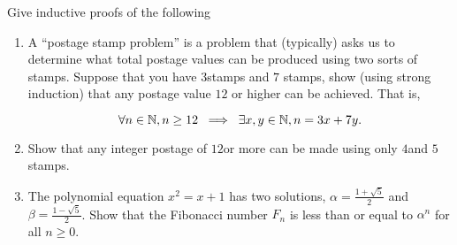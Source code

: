 
Give inductive proofs of the following 
\begin{enumerate}
\item A ``postage stamp problem'' is a problem that (typically) asks
us to determine what total postage values can be produced using two
sorts of stamps.  Suppose that you have $3$\cents stamps and $7$\cents 
stamps, show (using strong induction) that any postage value $12$\cents 
or higher can be achieved.  That is, 

\[ \forall n \in {\mathbb N}, n \geq 12 \; \implies \;
\exists x,y \in {\mathbb N} , n = 3x + 7y. \]
 
 \wbvfill

\workbookpagebreak

\item Show that any integer postage of $12$\cents or more can be made using
only $4$\cents and $5$\cents stamps.

\wbvfill


\item The polynomial equation $x^2 = x+1$ has two solutions, 
$\alpha = \frac{1+\sqrt{5}}{2}$ and $\beta = \frac{1-\sqrt{5}}{2}$.
Show that the Fibonacci number $F_n$ is less than or equal to $\alpha^{n}$
for all $n \geq 0$.

\wbvfill

\workbookpagebreak

\end{enumerate}



